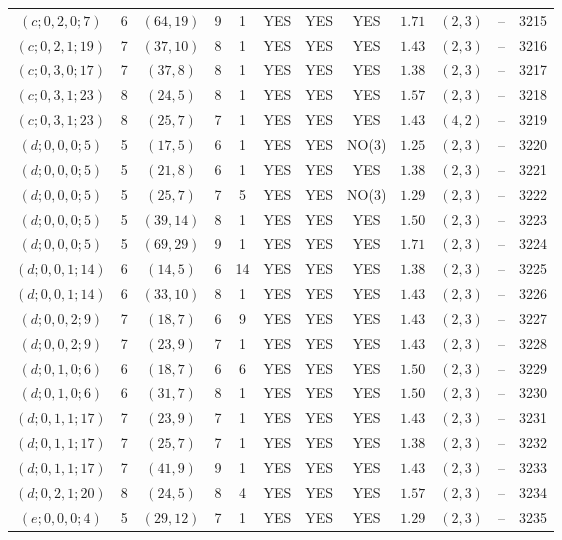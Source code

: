 \begin{longtable}{|c|c|c|c|c|c|c|c|c|c|c|c|}
$(c;0,2,0;7)$ & 6 & $(64,19)$ & 9 & 1 & YES & YES & YES & $1.71$ & $(2,3)$ & -- & 3215\\
$(c;0,2,1;19)$ & 7 & $(37,10)$ & 8 & 1 & YES & YES & YES & $1.43$ & $(2,3)$ & -- & 3216\\
$(c;0,3,0;17)$ & 7 & $(37,8)$ & 8 & 1 & YES & YES & YES & $1.38$ & $(2,3)$ & -- & 3217\\
$(c;0,3,1;23)$ & 8 & $(24,5)$ & 8 & 1 & YES & YES & YES & $1.57$ & $(2,3)$ & -- & 3218\\
$(c;0,3,1;23)$ & 8 & $(25,7)$ & 7 & 1 & YES & YES & YES & $1.43$ & $(4,2)$ & -- & 3219\\
$(d;0,0,0;5)$ & 5 & $(17,5)$ & 6 & 1 & YES & YES & NO(3) & $1.25$ & $(2,3)$ & -- & 3220\\
$(d;0,0,0;5)$ & 5 & $(21,8)$ & 6 & 1 & YES & YES & YES & $1.38$ & $(2,3)$ & -- & 3221\\
$(d;0,0,0;5)$ & 5 & $(25,7)$ & 7 & 5 & YES & YES & NO(3) & $1.29$ & $(2,3)$ & -- & 3222\\
$(d;0,0,0;5)$ & 5 & $(39,14)$ & 8 & 1 & YES & YES & YES & $1.50$ & $(2,3)$ & -- & 3223\\
$(d;0,0,0;5)$ & 5 & $(69,29)$ & 9 & 1 & YES & YES & YES & $1.71$ & $(2,3)$ & -- & 3224\\
$(d;0,0,1;14)$ & 6 & $(14,5)$ & 6 & 14 & YES & YES & YES & $1.38$ & $(2,3)$ & -- & 3225\\
$(d;0,0,1;14)$ & 6 & $(33,10)$ & 8 & 1 & YES & YES & YES & $1.43$ & $(2,3)$ & -- & 3226\\
$(d;0,0,2;9)$ & 7 & $(18,7)$ & 6 & 9 & YES & YES & YES & $1.43$ & $(2,3)$ & -- & 3227\\
$(d;0,0,2;9)$ & 7 & $(23,9)$ & 7 & 1 & YES & YES & YES & $1.43$ & $(2,3)$ & -- & 3228\\
$(d;0,1,0;6)$ & 6 & $(18,7)$ & 6 & 6 & YES & YES & YES & $1.50$ & $(2,3)$ & -- & 3229\\
$(d;0,1,0;6)$ & 6 & $(31,7)$ & 8 & 1 & YES & YES & YES & $1.50$ & $(2,3)$ & -- & 3230\\
$(d;0,1,1;17)$ & 7 & $(23,9)$ & 7 & 1 & YES & YES & YES & $1.43$ & $(2,3)$ & -- & 3231\\
$(d;0,1,1;17)$ & 7 & $(25,7)$ & 7 & 1 & YES & YES & YES & $1.38$ & $(2,3)$ & -- & 3232\\
$(d;0,1,1;17)$ & 7 & $(41,9)$ & 9 & 1 & YES & YES & YES & $1.43$ & $(2,3)$ & -- & 3233\\
$(d;0,2,1;20)$ & 8 & $(24,5)$ & 8 & 4 & YES & YES & YES & $1.57$ & $(2,3)$ & -- & 3234\\
$(e;0,0,0;4)$ & 5 & $(29,12)$ & 7 & 1 & YES & YES & YES & $1.29$ & $(2,3)$ & -- & 3235\\

\end{longtable}
